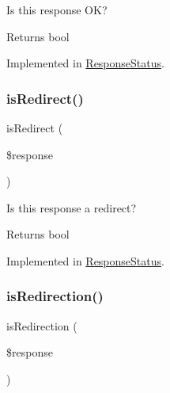 Is this response OK?

\begin{DoxyReturn}{Returns}
bool 
\end{DoxyReturn}


Implemented in \mbox{\hyperlink{class_pes_1_1_http_1_1_response_status_ab3105c65ed8a2617a4928f250dba979f}{Response\+Status}}.

\mbox{\label{interface_pes_1_1_http_1_1_response_status_interface_af59c219f65321f33f460c22d5661b751}} 
\subsubsection{\texorpdfstring{is\+Redirect()}{isRedirect()}}
{\footnotesize\ttfamily is\+Redirect (\begin{DoxyParamCaption}\item[{Response\+Interface}]{\$response }\end{DoxyParamCaption})}

Is this response a redirect?

\begin{DoxyReturn}{Returns}
bool 
\end{DoxyReturn}


Implemented in \mbox{\hyperlink{class_pes_1_1_http_1_1_response_status_af59c219f65321f33f460c22d5661b751}{Response\+Status}}.

\mbox{\label{interface_pes_1_1_http_1_1_response_status_interface_a5b211efda150fe422f2ae707392168d6}} 
\subsubsection{\texorpdfstring{is\+Redirection()}{isRedirection()}}
{\footnotesize\ttfamily is\+Redirection (\begin{DoxyParamCaption}\item[{Response\+Interface}]{\$response }\end{DoxyParamCaption})}


